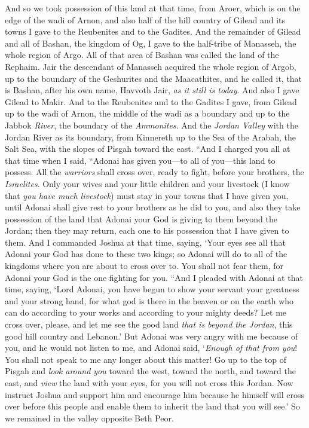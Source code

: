 \begin{biblechapter}
\verse And so we took possession of this land at that time, from Aroer, which is on the edge of the wadi of Arnon, and also half of the hill country of Gilead and its towns I gave to the Reubenites and to the Gadites.
\verse And the remainder of Gilead and all of Bashan, the kingdom of Og, I gave to the half-tribe of Manasseh, the whole region of Argo. All of that area of Bashan was called the land of the Rephaim.
\verse Jair the descendant of Manasseh acquired the whole region of Argob, up to the boundary of the Geshurites and the Maacathites, and he called it, that is Bashan, after his own name, Havvoth Jair, \textit{as it still is today}.
\verse And also I gave Gilead to Makir.
\verse And to the Reubenites and to the Gadites I gave, from Gilead up to the wadi of Arnon, the middle of the wadi as a boundary and up to the Jabbok \textit{River}, the boundary of the \textit{Ammonites}.
\verse And the \textit{Jordan Valley} with the Jordan River as its boundary, from Kinnereth up to the Sea of the Arabah, the Salt Sea, with the slopes of Pisgah toward the east.
\verse “And I charged you all at that time when I said, “Adonai has given you—to all of you—this land to possess. All the \textit{warriors} shall cross over, ready to fight, before your brothers, the \textit{Israelites}.
\verse Only your wives and your little children and your livestock (I know that \textit{you have much livestock}) must stay in your towns that I have given you,
\verse until Adonai shall give rest to your brothers as he did to you, and also they take possession of the land that Adonai your God is giving to them beyond the Jordan; then they may return, each one to his possession that I have given to them.
\verse And I commanded Joshua at that time, saying, ‘Your eyes see all that Adonai your God has done to these two kings; so Adonai will do to all of the kingdoms where you are about to cross over to.
\verse You shall not fear them, for Adonai your God is the one fighting for you.
\verse “And I pleaded with Adonai at that time, saying,
\verse ‘Lord Adonai, you have begun to show your servant your greatness and your strong hand, for what god is there in the heaven or on the earth who can do according to your works and according to your mighty deeds?
\verse Let me cross over, please, and let me see the good land \textit{that is beyond the Jordan}, this good hill country and Lebanon.’
\verse But Adonai was very angry with me because of you, and he would not listen to me, and Adonai said, ‘\textit{Enough of that from you}! You shall not speak to me any longer about this matter!
\verse Go up to the top of Pisgah and \textit{look around you} toward the west, toward the north, and toward the east, and \textit{view} the land with your eyes, for you will not cross this Jordan.
\verse Now instruct Joshua and support him and encourage him because he himself will cross over before this people and enable them to inherit the land that you will see.’
\verse So we remained in the valley opposite Beth Peor.
\end{biblechapter}

